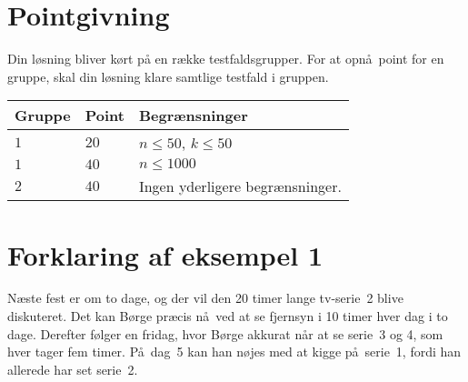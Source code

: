 \section*{Pointgivning}
Din løsning bliver kørt på en række testfaldsgrupper.
For at opnå point for en gruppe, skal din løsning klare samtlige testfald i gruppen.

\noindent
\begin{tabular}{ lll}
Gruppe & Point & Begrænsninger \\ \hline
$1$   & $20$       & $n \leq 50$, $k \leq 50$ \\
$1$   & $40$       & $n \leq 1000$ \\
$2$   & $40$       & Ingen yderligere begrænsninger.
\end{tabular}

\section*{Forklaring af eksempel 1}
Næste fest er om to dage, og der vil den 20 timer lange tv-serie~2 blive diskuteret.
Det kan Børge præcis nå ved at se fjernsyn i 10 timer hver dag i to dage.
Derefter følger en fridag, hvor Børge akkurat når at se serie~3 og 4, som hver tager fem timer.
På dag~5 kan han nøjes med at kigge på serie~1, fordi han allerede har set serie~2.
